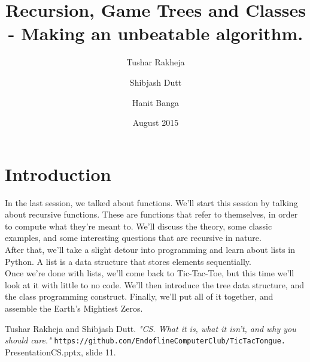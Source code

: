 \documentclass{article}
\title{Recursion, Game Trees and Classes - Making an unbeatable algorithm.}
\author[]{Tushar Rakheja}
\author[]{Shibjash Dutt}
\author[]{Hanit Banga}
\affil[]{\texttt{Instructors @ Endofline Computer Club}}
\date{August 2015}
\begin{document}
\maketitle

\section{Introduction}

In the last session, we talked about functions. We'll start this session by talking about recursive functions. These are functions that refer to themselves, in order to compute what they're meant to. We'll discuss the theory, some classic examples, and some interesting questions that are recursive in nature. \\

\noindent After that, we'll take a slight detour into programming and learn about lists in Python. A list is a data structure \cite{DSinPres_Slide} that stores elements sequentially.\\

\noindent Once we're done with lists, we'll come back to Tic-Tac-Toe, but this time we'll look at it with little to no code. We'll then introduce the tree data structure, and the class programming construct. Finally, we'll put all of it together, and assemble the Earth's Mightiest Zeros. 


\begin{thebibliography}{9}
Tushar Rakheja and Shibjash Dutt.
\textit{"CS. What it is, what it isn't, and why you should care."}
\texttt{https://github.com/EndoflineComputerClub/TicTacTongue.}
\\PresentationCS.pptx, slide 11. 
\end{thebibliography}
\end{document}
